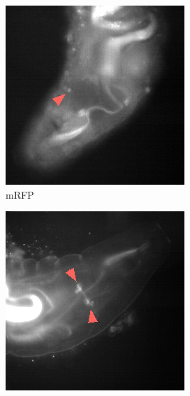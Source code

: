 \begin{figure}
	\centering
	\begin{subfigure}[b]{0.3\textwidth}
		\includegraphics[width=\textwidth]{mRFP_full}
		\caption{mRFP}
		\label{fig:mrfp}
	\end{subfigure}
	\quad%
	\begin{subfigure}[b]{0.3\textwidth}
		\includegraphics[width=\textwidth]{tdTomato_full}

\end{subfigure}
\end{figure}
